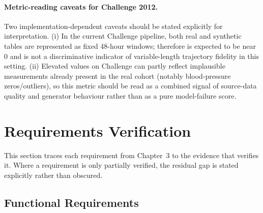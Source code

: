 \paragraph{Metric-reading caveats for Challenge 2012.}
Two implementation-dependent caveats should be stated explicitly for interpretation. (i) In the current Challenge pipeline, both real and synthetic tables are represented as fixed 48-hour windows; therefore  is expected to be near $0$ and is not a discriminative indicator of variable-length trajectory fidelity in this setting. (ii) Elevated  values on Challenge can partly reflect implausible measurements already present in the real cohort (notably blood-pressure zeros/outliers), so this metric should be read as a combined signal of source-data quality and generator behaviour rather than as a pure model-failure score.

\section{Requirements Verification}

This section traces each requirement from Chapter~3 to the evidence that verifies it. Where a requirement is only partially verified, the residual gap is stated explicitly rather than obscured.

\subsection{Functional Requirements}

